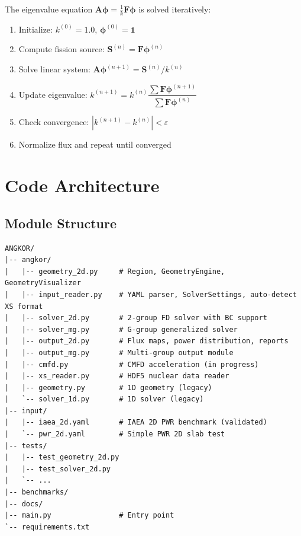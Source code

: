 \documentclass[12pt,a4paper]{article}
\begin{document}
The eigenvalue equation $\mathbf{A}\boldsymbol{\phi} =
\frac{1}{k}\mathbf{F}\boldsymbol{\phi}$ is solved iteratively:

\begin{enumerate}
    \item Initialize: $k^{(0)} = 1.0$, $\boldsymbol{\phi}^{(0)} = \mathbf{1}$
    \item Compute fission source: $\mathbf{S}^{(n)} = \mathbf{F}\boldsymbol{\phi}^{(n)}$
    \item Solve linear system: $\mathbf{A}\boldsymbol{\phi}^{(n+1)} = \mathbf{S}^{(n)}/k^{(n)}$
    \item Update eigenvalue:
        $k^{(n+1)} = k^{(n)} \dfrac{\sum \mathbf{F}\boldsymbol{\phi}^{(n+1)}}
        {\sum \mathbf{F}\boldsymbol{\phi}^{(n)}}$
    \item Check convergence: $|k^{(n+1)} - k^{(n)}| < \varepsilon$
    \item Normalize flux and repeat until converged
\end{enumerate}

\section{Code Architecture}

\subsection{Module Structure}

\begin{verbatim}
ANGKOR/
|-- angkor/
|   |-- geometry_2d.py     # Region, GeometryEngine, GeometryVisualizer
|   |-- input_reader.py    # YAML parser, SolverSettings, auto-detect XS format
|   |-- solver_2d.py       # 2-group FD solver with BC support
|   |-- solver_mg.py       # G-group generalized solver
|   |-- output_2d.py       # Flux maps, power distribution, reports
|   |-- output_mg.py       # Multi-group output module
|   |-- cmfd.py            # CMFD acceleration (in progress)
|   |-- xs_reader.py       # HDF5 nuclear data reader
|   |-- geometry.py        # 1D geometry (legacy)
|   `-- solver_1d.py       # 1D solver (legacy)
|-- input/
|   |-- iaea_2d.yaml       # IAEA 2D PWR benchmark (validated)
|   `-- pwr_2d.yaml        # Simple PWR 2D slab test
|-- tests/
|   |-- test_geometry_2d.py
|   |-- test_solver_2d.py
|   `-- ...
|-- benchmarks/
|-- docs/
|-- main.py                # Entry point
`-- requirements.txt
\end{verbatim}
\end{document}
